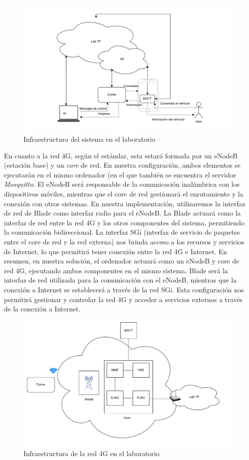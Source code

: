\begin{figure}[H]
\centering
\includegraphics[width = \textwidth]{Imagenes/Solucion/12.pdf}
\caption{Infraestructura del sistema en el laboratorio}
\label{12}
\end{figure}

En cuanto a la red 4G, según el estándar, esta estará formada por un eNodeB (estación base) y un \textit{core} de red. En nuestra configuración, ambos elementos se ejecutarán en el mismo ordenador (en el que también se encuentra el servidor \textit{Mosquitto}. El eNodeB será responsable de la comunicación inalámbrica con los dispositivos móviles, mientras que el core de red gestionará el enrutamiento y la conexión con otros sistemas.
En nuestra implementación, utilizaremos la interfaz de red de Blade como interfaz radio para el eNodeB. La Blade actuará como la interfaz de red entre la red 4G y los otros componentes del sistema, permitiendo la comunicación bidireccional.
La interfaz SGi (interfaz de servicio de paquetes entre el core de red y la red externa) nos brinda acceso a los recursos y servicios de Internet, lo que permitirá tener conexión entre la red 4G e Internet.
En resumen, en nuestra solución, el ordenador actuará como un eNodeB y core de red 4G, ejecutando ambos componentes en el mismo sistema. Blade será la interfaz de red utilizada para la comunicación con el eNodeB, mientras que la conexión a Internet se establecerá a través de la red SGi. Esta configuración nos permitirá gestionar y controlar la red 4G y acceder a servicios externos a través de la conexión a Internet.

\begin{figure}[H]
\centering
\includegraphics[width = \textwidth]{Imagenes/Solucion/11.pdf}
\caption{Infraestructura de la red 4G en el laboratorio}
\label{11}
\end{figure}


